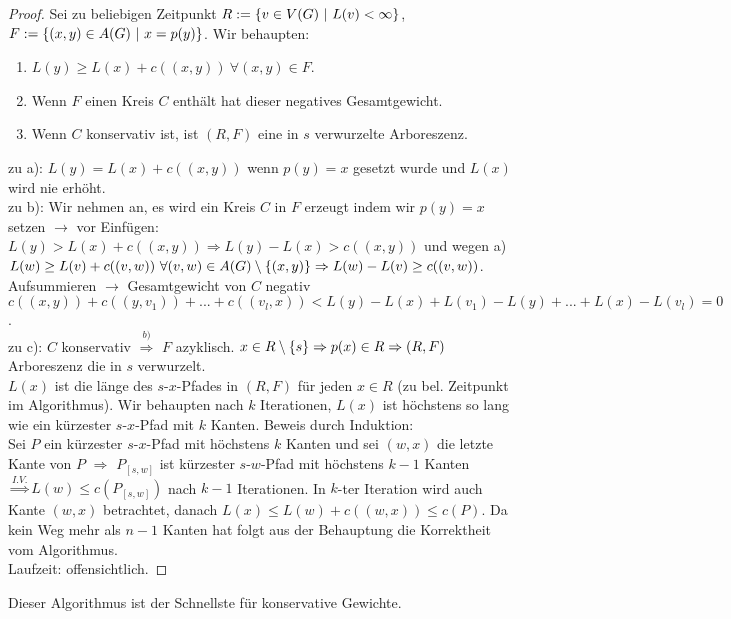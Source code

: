 \begin{proof}
	Sei zu beliebigen Zeitpunkt $R := \{v\in V(G) ~\vert~ L(v) < \infty\}$, $F := \{(x,y)\in A(G)~\vert~x=p(y)\}$. Wir behaupten:
	\begin{enumerate}[label=\alph*)]
		\item $L(y) \ge L(x) + c((x,y)) ~\forall (x,y)\in F$.
		\item Wenn $F$ einen Kreis $C$ enthält hat dieser negatives Gesamtgewicht.
		\item Wenn $C$ konservativ ist, ist $(R,F)$ eine in $s$ verwurzelte Arboreszenz.
	\end{enumerate}
	zu a): $L(y) = L(x) + c((x,y))$ wenn $p(y) = x$ gesetzt wurde und $L(x)$ wird nie erhöht.\\
	zu b): Wir nehmen an, es wird ein Kreis $C$ in $F$ erzeugt indem wir $p(y) = x$ setzen $\to$ vor Einfügen: $L(y) > L(x) + c((x,y)) \Rightarrow L(y) - L(x) > c((x,y))$ und wegen a) $L(w) \ge L(v) + c((v,w))~\forall (v,w) \in A(G)\setminus \{(x,y)\} \Rightarrow L(w) - L(v) \ge c((v,w))$. Aufsummieren $\to$ Gesamtgewicht von $C$ negativ $c((x,y)) + c((y, v_1)) + ... + c((v_l,x)) < L(y) - L(x) + L(v_1) - L(y) + ... + L(x) - L(v_l) = 0$.\\
	zu c): $C$ konservativ $\overset{b)}{\Rightarrow}$ $F$ azyklisch. $x\in R\setminus \{s\} \Rightarrow p(x) \in R \Rightarrow (R,F)$ Arboreszenz die in $s$ verwurzelt.\\
	$L(x)$ ist die länge des $s$-$x$-Pfades in $(R,F)$ für jeden $x\in R$ (zu bel. Zeitpunkt im Algorithmus). Wir behaupten nach $k$ Iterationen, $L(x)$ ist höchstens so lang wie ein kürzester $s$-$x$-Pfad mit $k$ Kanten. Beweis durch Induktion:\\
	Sei $P$ ein kürzester $s$-$x$-Pfad mit höchstens $k$ Kanten und sei $(w,x)$ die letzte Kante von $P$ $\Rightarrow$ $P_{[s,w]}$ ist kürzester $s$-$w$-Pfad mit höchstens $k-1$ Kanten $\overset{I.V.}{\Rightarrow} L(w) \le c(P_{[s,w]})$ nach $k-1$ Iterationen. In $k$-ter Iteration wird auch Kante $(w,x)$ betrachtet, danach $L(x) \le L(w) + c((w,x)) \le c(P)$. Da kein Weg mehr als $n-1$ Kanten hat folgt aus der Behauptung die Korrektheit vom Algorithmus.\\
	Laufzeit: offensichtlich.
\end{proof}
\begin{rem}
	Dieser Algorithmus ist der Schnellste für konservative Gewichte.
\end{rem}